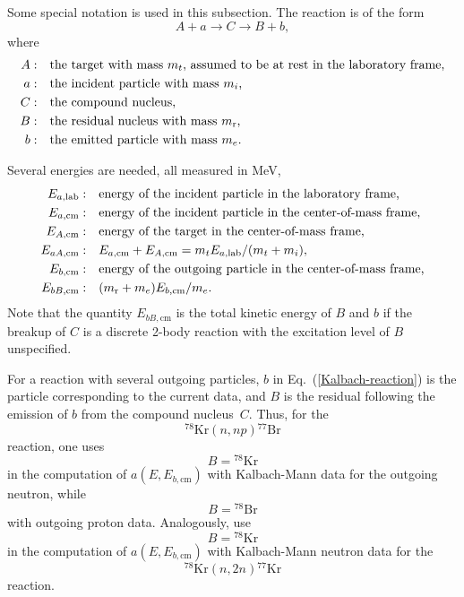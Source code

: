 {%
\newcommand{\Ealab}{E_{a,\text{lab}}}
\newcommand{\Eacm}{E_{a,\text{cm}}}
\newcommand{\EAcm}{E_{A,\text{cm}}}
\newcommand{\EaAcm}{E_{aA,\text{cm}}}
\newcommand{\Ebcm}{E_{b,\text{cm}}}
\newcommand{\EBcm}{E_{B,\text{cm}}}
\newcommand{\EbBcm}{E_{bB,\text{cm}}}
Some special notation is used in this subsection.  The reaction is of the form
\begin{equation}
  A + a \to C \to B + b,
 \label{Kalbach-reaction}
\end{equation}
where
\begin{align*}
  A:\quad &\text{the target with mass $m_t$, assumed to be at rest in the laboratory frame,} \\
  a:\quad &\text{the incident particle with mass $m_i$,} \\
  C:\quad &\text{the compound nucleus,} \\
  B:\quad &\text{the residual nucleus with mass $m_{\text{r}}$,} \\
  b:\quad &\text{the emitted particle with mass $m_e$.}
\end{align*}


Several energies are needed, all measured in MeV,
\begin{align*}
  \Ealab:\quad &\text{energy of the incident particle in the laboratory frame,} \\
  \Eacm:\quad &\text{energy of the incident particle in the center-of-mass frame,} \\
  \EAcm:\quad &\text{energy of the target in the center-of-mass frame,} \\
  \EaAcm:\quad &\Eacm + \EAcm = \mtarg \Ealab/( \mtarg + \myi), \\
  \Ebcm:\quad &\text{energy of the outgoing particle in the center-of-mass frame,} \\
  \EbBcm:\quad & (\mres + \myo) \Ebcm / \myo.
\end{align*}
Note that the quantity $\EbBcm$ is the total kinetic energy of $B$ and $b$ if
the breakup of $C$ is a discrete 2-body reaction with the excitation level
of $B$ unspecified.

For a reaction with several outgoing particles, $b$ in Eq.~(\ref{Kalbach-reaction})
is the particle corresponding to the current data, and $B$ is the residual
following the emission of $b$ from the compound nucleus~$C$.
Thus, for the
$$
   {}^{78}\text{Kr} (n, np) {}^{77}\text{Br}
$$
reaction, one uses
$$
   B =  {}^{78}\text{Kr}
$$
in the computation of $a(E, \Ebcm)$ with Kalbach-Mann data for the
outgoing neutron, while
$$
   B =  {}^{78}\text{Br}
$$
with outgoing proton data.  Analogously, use
$$
     B =  {}^{78}\text{Kr}
$$
in the computation of $a(E, \Ebcm)$ with Kalbach-Mann neutron data for the
$$
   {}^{78}\text{Kr} (n, 2n) {}^{77}\text{Kr}
$$
reaction.

}
